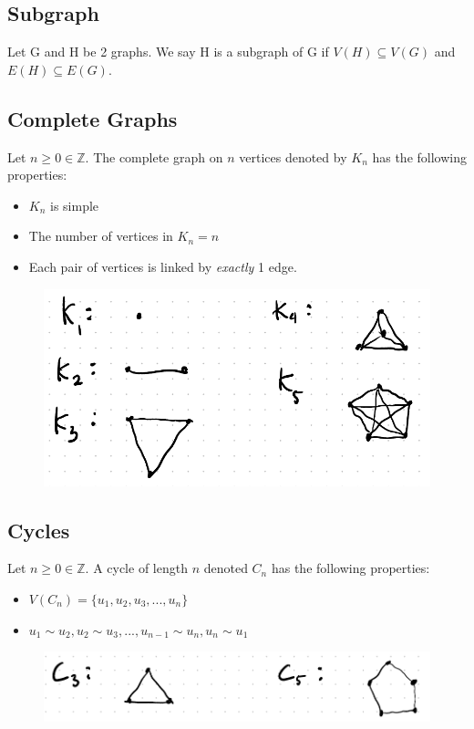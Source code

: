 \documentclass[12pt,letterpaper]{article} \usepackage{amsmath} \usepackage{graphicx}  \usepackage{longtable}  \usepackage{amssymb}
\begin{document}
        \subsection{Subgraph}
        Let G and H be 2 graphs. We say H is a subgraph of G if $V(H)\subseteq V(G)$ and $E(H)\subseteq E(G)$.

        \subsection{Complete Graphs}
        Let $n \ge 0 \in \mathbb{Z}$. The complete graph on $n$ vertices denoted by $K_n$ has the following properties:
        \begin{itemize}[noitemsep]
            \item $K_n$ is simple
            \item The number of vertices in $K_n = n$
            \item Each pair of vertices is linked by \emph{exactly} 1 edge.
        \end{itemize}

        \begin{figure}[H]
            \centering
            \includegraphics[width=0.5\linewidth]{kn.png}
        \end{figure}

        \subsection{Cycles}
        Let $n\ge 0 \in \mathbb{Z}$. A cycle of length $n$ denoted $C_n$ has the following properties:
        \begin{itemize}[noitemsep]
            \item $V(C_n) = \{u_1, u_2, u_3, ..., u_n\}$
            \item $u_1 \sim u_2, u_2 \sim u_3, ..., u_{n-1} \sim u_n, u_n \sim u_1$
        \end{itemize}

        \begin{figure}[H]
            \centering
            \includegraphics[width=0.5\linewidth]{cycle.png}
        \end{figure}
\end{document}
